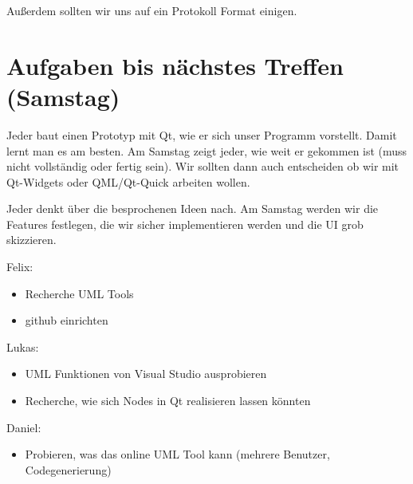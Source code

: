\documentclass[a4paper]{article}
\begin{document}
Außerdem sollten wir uns auf ein Protokoll Format einigen.

\section{Aufgaben bis nächstes Treffen (Samstag)}

Jeder baut einen Prototyp mit Qt, wie er sich unser Programm vorstellt. Damit lernt man es am besten. Am Samstag zeigt jeder, wie weit er gekommen ist (muss nicht vollständig oder fertig sein). Wir sollten dann auch entscheiden ob wir mit Qt-Widgets oder QML/Qt-Quick arbeiten wollen.

Jeder denkt über die besprochenen Ideen nach. Am Samstag werden wir die Features festlegen, die wir sicher implementieren werden und die UI grob skizzieren.

Felix:
\begin{itemize}
	\item Recherche UML Tools
	\item github einrichten
\end{itemize}

Lukas:
\begin{itemize}
	\item UML Funktionen von Visual Studio ausprobieren
	\item Recherche, wie sich Nodes in Qt realisieren lassen könnten
\end{itemize}

Daniel:
\begin{itemize}
	\item Probieren, was das online UML Tool kann (mehrere Benutzer, Codegenerierung)
\end{itemize}
\end{document}
